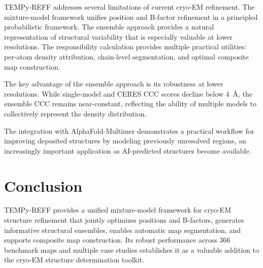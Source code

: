 \documentclass[11pt]{article}
\begin{document}
TEMPy-REFF addresses several limitations of current cryo-EM refinement. The mixture-model framework unifies position and B-factor refinement in a principled probabilistic framework. The ensemble approach provides a natural representation of structural variability that is especially valuable at lower resolutions. The responsibility calculation provides multiple practical utilities: per-atom density attribution, chain-level segmentation, and optimal composite map construction.

The key advantage of the ensemble approach is its robustness at lower resolutions. While single-model and CERES CCC scores decline below 4~\AA, the ensemble CCC remains near-constant, reflecting the ability of multiple models to collectively represent the density distribution.

The integration with AlphaFold-Multimer \citep{jumper2021alphafold} demonstrates a practical workflow for improving deposited structures by modeling previously unresolved regions, an increasingly important application as AI-predicted structures become available.

\section{Conclusion}

TEMPy-REFF provides a unified mixture-model framework for cryo-EM structure refinement that jointly optimizes positions and B-factors, generates informative structural ensembles, enables automatic map segmentation, and supports composite map construction. Its robust performance across 366 benchmark maps and multiple case studies establishes it as a valuable addition to the cryo-EM structure determination toolkit.



\end{document}
